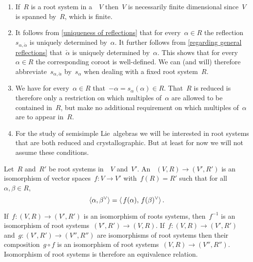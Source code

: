 \begin{remark}
  \leavevmode
  \begin{enumerate}
    \item
      If~$R$ is a root system in a~{\vectorspace{$\kf$}}~$V$ then~$V$ is necessarily finite dimensional since~$V$ is spanned by~$R$, which is finite.
    \item
      It follows from \cref{uniqueness of reflections} that for every~$\alpha \in R$ the reflection~$s_{\alpha, \check{\alpha}}$ is uniquely determined by~$\alpha$.
      It further follows from \cref{regarding general reflections} that~$\check{\alpha}$ is uniquely determined by~$\alpha$.
      This shows that for every~$\alpha \in R$ the corresponding coroot is well-defined.
      We can (and will) therefore abbreviate~$s_{\alpha, \check{\alpha}}$ by~$s_\alpha$ when dealing with a fixed root system~$R$.
    \item
      We have for every~$\alpha \in R$ that~$-\alpha = s_\alpha(\alpha) \in R$.
      That~$R$ is reduced is therefore only a restriction on which multiples of~$\alpha$ are allowed to be contained in~$R$, but make no additional requirement on which multiples of~$\alpha$ are to appear in~$R$.
    \item
      For the study of semisimple Lie~algebras we will be interested in root systems that are both reduced and crystallographic.
      But at least for now we will not assume these conditions.
  \end{enumerate}
\end{remark}


\begin{definition}
  Let~$R$ and~$R'$ be root systems in~{\vectorspaces{$\kf$}}~$V$ and~$V'$.
  An ~$(V,R) \to (V',R')$ is an isomorphism of vector spaces~$f \colon V \to V'$ with~$f(R) = R'$ such that for all~$\alpha, \beta \in R$,
  \[
    \pair{\alpha, \check{\beta}}
    =
    \pair{\spacing f(\alpha), \spacing \check{f(\beta)}} \,.
  \]
\end{definition}


\begin{remark}
  If~$f \colon (V,R) \to (V',R')$ is an isomorphism of roots systems, then~$f^{-1}$ is an isomorphism of root systems~$(V',R') \to (V,R)$.
  If~$f \colon (V, R) \to (V', R')$ and~$g \colon (V', R') \to (V'', R'')$ are isomorphisms of root systems then their composition~$g \circ f$ is an isomorphism of root systems~$(V, R) \to (V'', R'')$.
  Isomorphism of root systems is therefore an equivalence relation.
\end{remark}


